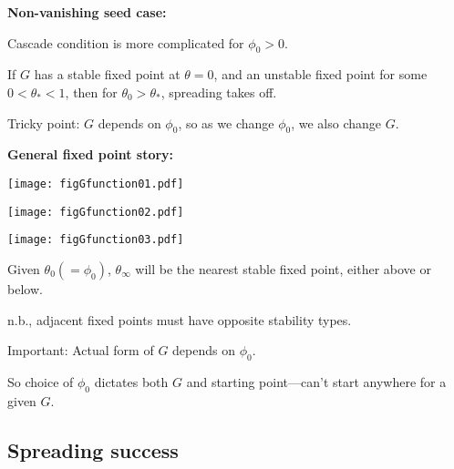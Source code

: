 {{{{  

  \textbf{Non-vanishing seed case:}
    
     
      Cascade condition is more complicated for
      $\phi_0 > 0$.
     
      If $G$ has a \alert{stable fixed point} at $\theta = 0$,
      and an \alert{unstable fixed point} for some $0 < \theta_\ast < 1$,
      then for $\theta_0  > \theta_\ast$, spreading takes off.
    
      Tricky point: $G$ depends on $\phi_0$, so as we change
      $\phi_0$, we also change $G$.
    
  


  \textbf{General fixed point story:}

  
          
      \texttt{[image: figGfunction01.pdf]}
      
      \texttt{[image: figGfunction02.pdf]}
      
      \texttt{[image: figGfunction03.pdf]}
    
    
     
      Given $\theta_0 (= \phi_0)$, $\theta_\infty$ will be 
      the nearest stable fixed point, either above or below.
     
      n.b., adjacent fixed points must have opposite stability types.
     
      \alert{Important:}
      Actual form of $G$ depends on $\phi_0$.  
    
      So choice of $\phi_0$ dictates both $G$ and starting
      point---can't start anywhere for a given $G$.
    
  


\subsection{Spreading success}



}}}}
